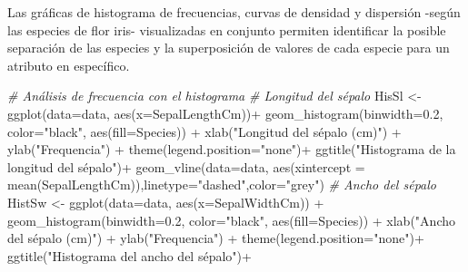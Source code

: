 \documentclass[
]{article}
\newenvironment{Shaded}{\begin{snugshade}}{\end{snugshade}}
\newcommand{\AttributeTok}[1]{\textcolor[rgb]{0.77,0.63,0.00}{#1}}
\newcommand{\CommentTok}[1]{\textcolor[rgb]{0.56,0.35,0.01}{\textit{#1}}}
\newcommand{\FloatTok}[1]{\textcolor[rgb]{0.00,0.00,0.81}{#1}}
\newcommand{\FunctionTok}[1]{\textcolor[rgb]{0.00,0.00,0.00}{#1}}
\newcommand{\NormalTok}[1]{#1}
\newcommand{\OtherTok}[1]{\textcolor[rgb]{0.56,0.35,0.01}{#1}}
\newcommand{\SpecialCharTok}[1]{\textcolor[rgb]{0.00,0.00,0.00}{#1}}
\newcommand{\StringTok}[1]{\textcolor[rgb]{0.31,0.60,0.02}{#1}}
\begin{document}
Las gráficas de histograma de frecuencias, curvas de densidad y
dispersión -según las especies de flor iris- visualizadas en conjunto
permiten identificar la posible separación de las especies y la
superposición de valores de cada especie para un atributo en específico.

\begin{Shaded}
\begin{Highlighting}[]
\CommentTok{\# Análisis de frecuencia con el histograma}
\CommentTok{\# Longitud del sépalo }
\NormalTok{HisSl }\OtherTok{\textless{}{-}} \FunctionTok{ggplot}\NormalTok{(}\AttributeTok{data=}\NormalTok{data, }\FunctionTok{aes}\NormalTok{(}\AttributeTok{x=}\NormalTok{SepalLengthCm))}\SpecialCharTok{+}
  \FunctionTok{geom\_histogram}\NormalTok{(}\AttributeTok{binwidth=}\FloatTok{0.2}\NormalTok{, }\AttributeTok{color=}\StringTok{"black"}\NormalTok{, }\FunctionTok{aes}\NormalTok{(}\AttributeTok{fill=}\NormalTok{Species)) }\SpecialCharTok{+} 
  \FunctionTok{xlab}\NormalTok{(}\StringTok{"Longitud del sépalo (cm)"}\NormalTok{) }\SpecialCharTok{+}  
  \FunctionTok{ylab}\NormalTok{(}\StringTok{"Frequencia"}\NormalTok{) }\SpecialCharTok{+} 
  \FunctionTok{theme}\NormalTok{(}\AttributeTok{legend.position=}\StringTok{"none"}\NormalTok{)}\SpecialCharTok{+}
  \FunctionTok{ggtitle}\NormalTok{(}\StringTok{"Histograma de la longitud del sépalo"}\NormalTok{)}\SpecialCharTok{+}
  \FunctionTok{geom\_vline}\NormalTok{(}\AttributeTok{data=}\NormalTok{data, }\FunctionTok{aes}\NormalTok{(}\AttributeTok{xintercept =} \FunctionTok{mean}\NormalTok{(SepalLengthCm)),}\AttributeTok{linetype=}\StringTok{"dashed"}\NormalTok{,}\AttributeTok{color=}\StringTok{"grey"}\NormalTok{)}
\CommentTok{\# Ancho del sépalo}
\NormalTok{HistSw }\OtherTok{\textless{}{-}} \FunctionTok{ggplot}\NormalTok{(}\AttributeTok{data=}\NormalTok{data, }\FunctionTok{aes}\NormalTok{(}\AttributeTok{x=}\NormalTok{SepalWidthCm)) }\SpecialCharTok{+}
  \FunctionTok{geom\_histogram}\NormalTok{(}\AttributeTok{binwidth=}\FloatTok{0.2}\NormalTok{, }\AttributeTok{color=}\StringTok{"black"}\NormalTok{, }\FunctionTok{aes}\NormalTok{(}\AttributeTok{fill=}\NormalTok{Species)) }\SpecialCharTok{+} 
  \FunctionTok{xlab}\NormalTok{(}\StringTok{"Ancho del sépalo (cm)"}\NormalTok{) }\SpecialCharTok{+}  
  \FunctionTok{ylab}\NormalTok{(}\StringTok{"Frequencia"}\NormalTok{) }\SpecialCharTok{+} 
  \FunctionTok{theme}\NormalTok{(}\AttributeTok{legend.position=}\StringTok{"none"}\NormalTok{)}\SpecialCharTok{+}
  \FunctionTok{ggtitle}\NormalTok{(}\StringTok{"Histograma del ancho del sépalo"}\NormalTok{)}\SpecialCharTok{+}

\end{Highlighting}
\end{Shaded}
\end{document}
